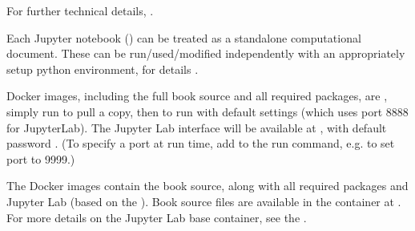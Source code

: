 \documentclass[letterpaper,table,10pt,english]{jupyterBook}
\begin{document}
\sphinxAtStartPar
For further technical details, .

\sphinxAtStartPar
{}

\begin{DUlineblock}{0em}
\item[] 
\end{DUlineblock}

\sphinxAtStartPar
Each Jupyter notebook () can be treated as a stand\sphinxhyphen{}alone computational document. These can be run/used/modified independently with an appropriately setup python environment, for details .

\begin{DUlineblock}{0em}
\item[] 
\end{DUlineblock}

\sphinxAtStartPar
Docker images, including the full book source and all required packages, are , simply run  to pull a copy, then  to run with default settings (which uses port 8888 for JupyterLab). The Jupyter Lab interface will be available at , with default password . (To specify a port at run time, add  to the run command, e.g.  to set port to 9999.)

\sphinxAtStartPar
The Docker images contain the book source, along with all required packages and Jupyter Lab (based on the ). Book source files are available in the container at . For more details on the Jupyter Lab base container, see the .
\end{document}
